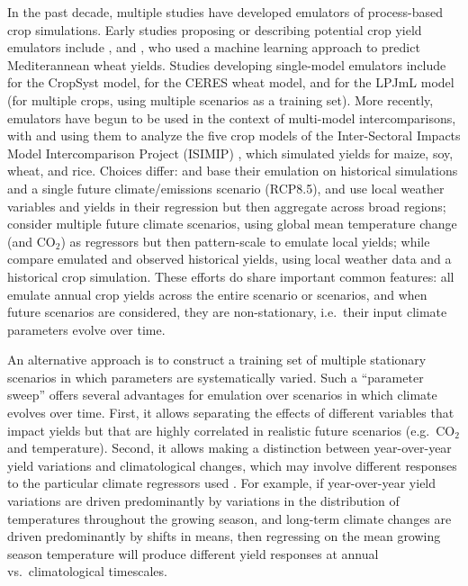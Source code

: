 \documentclass[preprint, 5p, times, twocolumn]{elsarticle}
\begin{document}
In the past decade, multiple studies have developed emulators of process-based crop simulations. Early studies proposing or describing potential crop yield emulators include \citet{Howden2005, raisen2006, Lobell2010}, and \citet{Ferrise2011}, who used a machine learning approach to predict Mediterannean wheat yields. Studies developing single-model emulators include  \citet{Holzkamper2012} for the CropSyst model, \citet{RUANE2013a} for the CERES wheat model, and \citet{Oyebamiji15} for the LPJmL model (for multiple crops, using multiple scenarios as a training set). More recently, emulators have begun to be used in the context of multi-model intercomparisons, with \citet{BLANC2015, BLANC2017, Ostberg2018} and \citet{Mistry2017} using them to analyze the five crop models of the Inter-Sectoral Impacts Model Intercomparison Project (ISIMIP) \citep{Warszawski3228}, which simulated yields for maize, soy, wheat, and rice. Choices differ: \citet{BLANC2015} and \citet{BLANC2017} base their emulation on historical simulations and a single future climate/emissions scenario (RCP8.5), and use local weather variables and yields in their regression but then aggregate across broad regions; \citet{Ostberg2018} consider multiple future climate scenarios, using global mean temperature change (and CO$_2$) as regressors but then pattern-scale to emulate local yields; while \citet{Mistry2017} compare emulated and observed historical yields, using local weather data and a historical crop simulation. These efforts do share important common features: all emulate annual crop yields across the entire scenario or scenarios, and when future scenarios are considered, they are non-stationary, i.e.\ their input climate parameters evolve over time.

An alternative approach is to construct a training set of multiple stationary scenarios in which parameters are systematically varied. Such a ``parameter sweep'' offers several advantages for emulation over scenarios in which climate evolves over time.  First, it allows separating the effects of different variables that impact yields but that are highly correlated in realistic future scenarios (e.g.\ CO$_2$ and temperature). Second, it allows making a distinction between year-over-year yield variations and climatological changes, which may involve different responses to the particular climate regressors used \citep[e.g.][]{Ruane2016}. For example, if year-over-year yield variations are driven predominantly by variations in the distribution of temperatures throughout the growing season, and long-term climate changes are driven predominantly by shifts in means, then regressing on the mean growing season temperature will produce different yield responses at annual vs.\ climatological timescales.  
\end{document}
